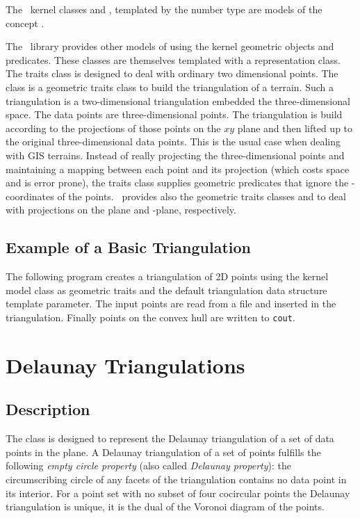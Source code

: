 The \cgal\  kernel classes  and
,
templated by the number type  
are models of the concept .

The \cgal\  library provides  other models
of  
using the kernel geometric objects and predicates.
These classes are themselves templated with a representation class. 
The traits class 
is designed to deal with ordinary  two dimensional points.
The class  
is a geometric traits class to build the triangulation
of a terrain. Such a triangulation is a two-dimensional
triangulation embedded  the three-dimensional space.
The data points are three-dimensional points.
The triangulation is 
build according to  the projections of those points
on the $xy$ plane  and then lifted up to the original
three-dimensional data points.
This is the usual case when dealing with GIS terrains.
Instead of really projecting the  three-dimensional points and
maintaining a mapping between each point and its projection
 (which costs space and is error prone),
the traits class  supplies geometric predicates that ignore the
-coordinates of the points.
\cgal\ provides also the geometric traits classes
 and
 to
deal with projections on the
  plane  and  -plane,
respectively.

\subsection{Example of a Basic Triangulation}
\label{Subsection_2D_Triangulations_Basic_Example}

The following program  creates a  triangulation of 2D points
using the kernel model class 
as geometric traits and the default triangulation data structure
template parameter.
 The input points are read from a file 
and inserted in the triangulation.
Finally points on the convex hull are written to {\tt cout}. 


\section{Delaunay Triangulations}
\label{Section_2D_Triangulations_Delaunay}

\subsection{Description}
\label{Subsection_2D_Triangulations_Delaunay_Description}
The class  is designed to represent
the Delaunay triangulation of a set of data points in the plane.
A  Delaunay triangulation of a set of points
fulfills
the following {\em empty circle property} 
(also called {\em Delaunay property}): the circumscribing
circle of any facets of the triangulation 
contains no data point in its interior.
For a point set with no subset of four cocircular points
the Delaunay triangulation is unique, it is  the dual
of the Voronoi diagram of the points.


